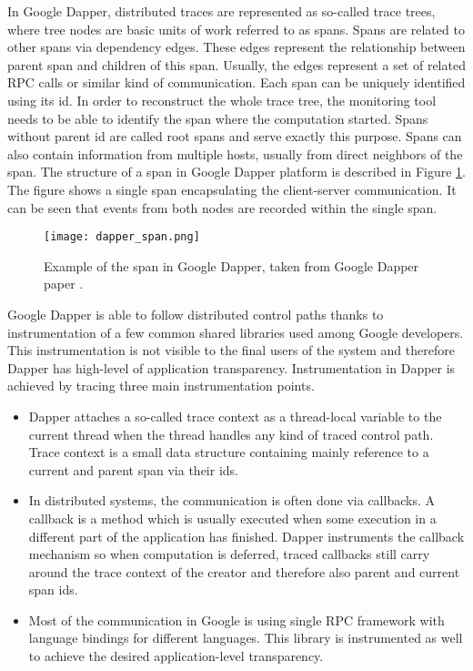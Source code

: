 In Google Dapper, distributed traces are represented as so-called trace trees, where tree nodes are basic units of work referred to as spans. Spans are related to other spans via dependency edges. These edges represent the relationship between parent span and children of this span. Usually, the edges represent a set of related RPC calls or similar kind of communication. Each span can be uniquely identified using its id. In order to reconstruct the whole trace tree, the monitoring tool needs to be able to identify the span where the computation started. Spans without parent id are called root spans and serve exactly this purpose. Spans can also contain information from multiple hosts, usually from direct neighbors of the span. The structure of a span in Google Dapper platform is described in Figure \ref{fig:dapper_span}. The figure shows a single span encapsulating the client-server communication. It can be seen that events from both nodes are recorded within the single span.
\begin{figure}
	\centering
		\texttt{[image: dapper\_span.png]}
	\caption{Example of the span in Google Dapper, taken from Google Dapper paper \cite{DapperPaper}.}
	\label{fig:dapper_span}
\end{figure}

Google Dapper is able to follow distributed control paths thanks to instrumentation of a few common shared libraries used among Google developers. This instrumentation is not visible to the final users of the system and therefore Dapper has high-level of application transparency. Instrumentation in Dapper is achieved by tracing three main instrumentation points. 
\begin{itemize}
	\item Dapper attaches a so-called trace context as a thread-local variable to the current thread when the thread handles any kind of traced control path. Trace context is a small data structure containing mainly reference to a current and parent span via their ids.
	
	\item In distributed systems, the communication is often done via callbacks. A callback is a method which is usually executed when some execution in a different part of the application has finished. Dapper instruments the callback mechanism so when computation is deferred, traced callbacks still carry around the trace context of the creator and therefore also parent and current span ids.
	
	\item Most of the communication in Google is using single RPC framework with language bindings for different languages. This library is instrumented as well to achieve the desired application-level transparency.
\end{itemize}

